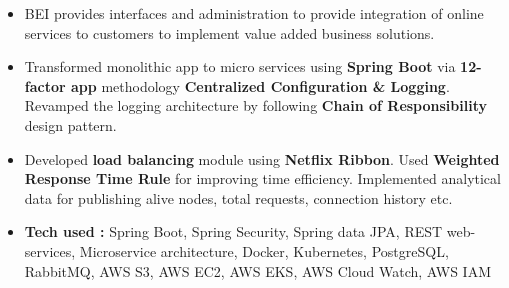 \documentclass[9.5pt,a4paper]{altacv}
\begin{document}
\begin{itemize}

    \item 
    BEI provides interfaces and administration to provide integration of online services to customers to implement value added business solutions. 
    
    \item
    Transformed monolithic app to micro services using \textbf{Spring Boot} via  \textbf{12-factor app} methodology \textbf{Centralized Configuration \& Logging}. Revamped the logging architecture by following \textbf{Chain of Responsibility} design pattern.
    
    \item
    Developed \textbf{load balancing} module using \textbf{Netflix Ribbon}. Used \textbf{    Weighted Response Time Rule} for improving time efficiency. Implemented analytical data for publishing alive nodes, total requests, connection history etc.
    
    
    
	
    
    \item \textbf{\textcolor{accent}{Tech used :}} 
    \textcolor{accent}{
    Spring Boot, Spring Security, Spring data JPA, REST web-services, Microservice architecture,  Docker, Kubernetes, PostgreSQL, RabbitMQ, AWS S3, AWS EC2, AWS EKS, AWS Cloud Watch, AWS IAM}
    
\end{itemize}
\end{document}
